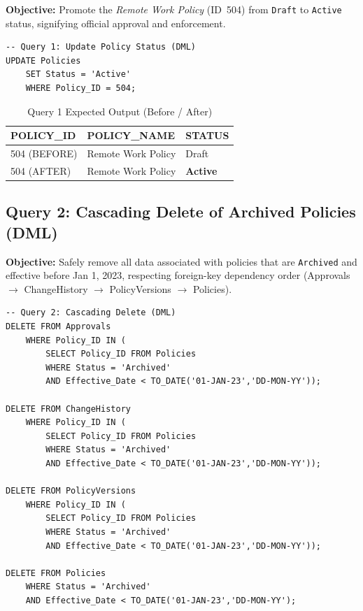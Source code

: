 \documentclass[conference]{IEEEtran}
\begin{document}
\textbf{Objective:} Promote the \textit{Remote Work Policy} (ID~504) from \texttt{Draft} to \texttt{Active} status, signifying official approval and enforcement.

\begin{lstlisting}[style=sqlstyle, caption={Query 1: UPDATE Policy Status}]
-- Query 1: Update Policy Status (DML)
UPDATE Policies
    SET Status = 'Active'
    WHERE Policy_ID = 504;
\end{lstlisting}

\begin{table}[H]
\centering
\caption{Query 1 Expected Output (Before / After)}
\begin{tabular}{|l|l|l|}
\hline
\textbf{POLICY\_ID} & \textbf{POLICY\_NAME} & \textbf{STATUS} \\
\hline
504 (BEFORE) & Remote Work Policy & Draft \\
504 (AFTER)  & Remote Work Policy & \textbf{Active} \\
\hline
\end{tabular}
\end{table}

\subsection{Query 2: Cascading Delete of Archived Policies (DML)}

\textbf{Objective:} Safely remove all data associated with policies that are \texttt{Archived} and effective before Jan 1, 2023, respecting foreign-key dependency order (Approvals $\to$ ChangeHistory $\to$ PolicyVersions $\to$ Policies).

\begin{lstlisting}[style=sqlstyle, caption={Query 2: Cascading DELETE}]
-- Query 2: Cascading Delete (DML)
DELETE FROM Approvals
    WHERE Policy_ID IN (
        SELECT Policy_ID FROM Policies
        WHERE Status = 'Archived'
        AND Effective_Date < TO_DATE('01-JAN-23','DD-MON-YY'));

DELETE FROM ChangeHistory
    WHERE Policy_ID IN (
        SELECT Policy_ID FROM Policies
        WHERE Status = 'Archived'
        AND Effective_Date < TO_DATE('01-JAN-23','DD-MON-YY'));

DELETE FROM PolicyVersions
    WHERE Policy_ID IN (
        SELECT Policy_ID FROM Policies
        WHERE Status = 'Archived'
        AND Effective_Date < TO_DATE('01-JAN-23','DD-MON-YY'));

DELETE FROM Policies
    WHERE Status = 'Archived'
    AND Effective_Date < TO_DATE('01-JAN-23','DD-MON-YY');
\end{lstlisting}
\end{document}
